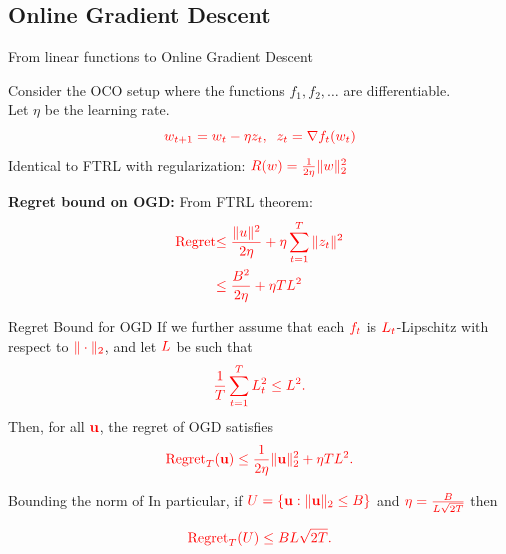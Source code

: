 \documentclass[handout]{beamer}
\begin{document}
\subsection{Online Gradient Descent}
\begin{frame}{From linear functions to Online Gradient Descent}
\begin{example}
  Consider the OCO setup where the functions $f_1,f_2,\ldots$ are differentiable.\\
  Let $\eta$ be the learning rate.
\[
  \textcolor{red}{w_{t+1} = w_t - \eta z_t,\;\;
    z_t = \nabla f_t(w_t)}
\]
Identical to FTRL with regularization: $\textcolor{red}{R(w) = \frac{1}{2\eta}\|w\|_2^2}$
\end{example}


{\bf Regret bound on OGD:} From FTRL theorem:
\begin{align*}
\textcolor{red}{\text{Regret}} &\textcolor{red}{\leq \frac{\|u\|^2}{2\eta} + \eta \sum_{t=1}^T \|z_t\|^2} \\
&\textcolor{red}{\leq \frac{B^2}{2\eta} + \eta T L^2}
\end{align*}
\end{frame}

\begin{frame}{Regret Bound for OGD}
  If we further assume that each \(\textcolor{red}{f_t}\) is \(\textcolor{red}{L_t}\)-Lipschitz with respect to \(\textcolor{red}{\|\cdot\|_2}\),
  and let \(\textcolor{red}{L}\) be such that 
  \[
    \textcolor{red}{\frac{1}{T} \sum_{t=1}^{T} L_t^2 \leq L^2.}
  \]
  Then, for all \(\textcolor{red}{\mathbf{u}}\), the regret of OGD satisfies
  \begin{equation*}
    \textcolor{red}{\text{Regret}_T(\mathbf{u}) \leq \frac{1}{2\eta} \|\mathbf{u}\|_2^2 + \eta T L^2.}
  \end{equation*}
\end{frame}

\begin{frame}{Bounding the norm of }
    In particular, if \(\textcolor{red}{U = \{\mathbf{u} : \|\mathbf{u}\|_2 \leq B\}}\) and 
    \(\textcolor{red}{\eta = \frac{B}{L\sqrt{2T}}}\) then

    \begin{equation*}
        \textcolor{red}{\text{Regret}_T(U) \leq B L \sqrt{2T}.}
    \end{equation*}
\end{frame}
\end{document}
